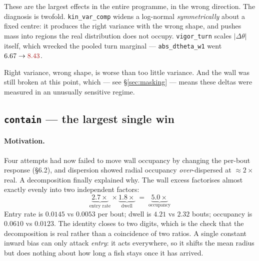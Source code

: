 \documentclass[11pt,a4paper]{article}
\newcommand{\lose}[1]{\textcolor{losec}{#1}}
\newcommand{\dth}{\ensuremath{\Delta\theta}}
\newcommand{\code}[1]{\texttt{\small #1}}
\begin{document}
These are the largest effects in the entire programme, in the wrong direction. The
diagnosis is twofold. \code{kin\_var\_comp} widens a log-normal \emph{symmetrically} about
a fixed centre: it produces the right variance with the wrong shape, and pushes mass into
regions the real distribution does not occupy. \code{vigor\_turn} scales $|\dth|$ itself,
which wrecked the pooled turn marginal --- \code{abs\_dtheta\_w1} went
$6.67 \to \lose{8.43}$.

\begin{takeaway}
Right variance, wrong shape, is worse than too little variance. And the wall was still
broken at this point, which --- see \S\ref{sec:masking} --- means these deltas were
measured in an unusually sensitive regime.
\end{takeaway}

\subsection{\texttt{contain} --- the largest single win}\label{sec:contain}

\paragraph{Motivation.}
Four attempts had now failed to move wall occupancy by changing the per-bout response
(\S6.2), and dispersion showed radial occupancy \emph{over}-dispersed at $\approx 2\times$
real. A decomposition finally explained why. The wall excess factorises almost exactly
evenly into two independent factors:
\begin{equation}
\underbrace{2.7\times}_{\text{entry rate}} \times
\underbrace{1.8\times}_{\text{dwell}} \;=\; \underbrace{5.0\times}_{\text{occupancy}}
\end{equation}
Entry rate is $0.0145$ vs $0.0053$ per bout; dwell is $4.21$ vs $2.32$ bouts; occupancy is
$0.0610$ vs $0.0123$. The identity closes to two digits, which is the check that the
decomposition is real rather than a coincidence of two ratios. A single constant inward
bias can only attack \emph{entry}: it acts everywhere, so it shifts the mean radius but
does nothing about how long a fish stays once it has arrived.
\end{document}
